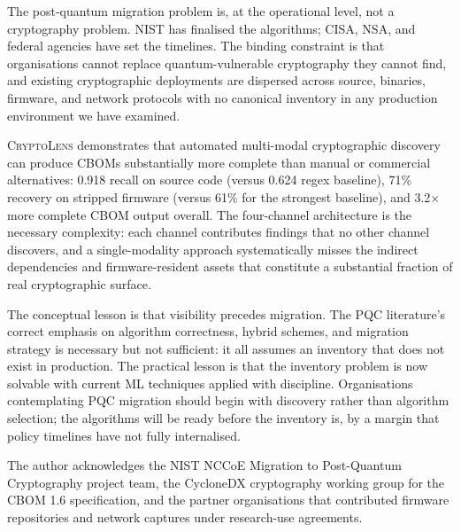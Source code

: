 \documentclass[sigconf,nonacm]{acmart}
\begin{document}
The post-quantum migration problem is, at the operational level,
not a cryptography problem. NIST has finalised the algorithms;
CISA, NSA, and federal agencies have set the timelines. The
binding constraint is that organisations cannot replace
quantum-vulnerable cryptography they cannot find, and existing
cryptographic deployments are dispersed across source, binaries,
firmware, and network protocols with no canonical inventory in any
production environment we have examined.

\textsc{CryptoLens} demonstrates that automated multi-modal
cryptographic discovery can produce CBOMs substantially more
complete than manual or commercial alternatives: 0.918 recall on
source code (versus 0.624 regex baseline), 71\% recovery on
stripped firmware (versus 61\% for the strongest baseline), and
3.2$\times$ more complete CBOM output overall. The four-channel
architecture is the necessary complexity: each channel contributes
findings that no other channel discovers, and a single-modality
approach systematically misses the indirect dependencies and
firmware-resident assets that constitute a substantial fraction of
real cryptographic surface.

The conceptual lesson is that visibility precedes migration. The
PQC literature's correct emphasis on algorithm correctness, hybrid
schemes, and migration strategy is necessary but not sufficient: it
all assumes an inventory that does not exist in production. The
practical lesson is that the inventory problem is now solvable with
current ML techniques applied with discipline. Organisations
contemplating PQC migration should begin with discovery rather than
algorithm selection; the algorithms will be ready before the
inventory is, by a margin that policy timelines have not fully
internalised.

\begin{acks}
The author acknowledges the NIST NCCoE Migration to Post-Quantum
Cryptography project team, the CycloneDX cryptography working group
for the CBOM 1.6 specification, and the partner organisations that
contributed firmware repositories and network captures under
research-use agreements.
\end{acks}
\end{document}
